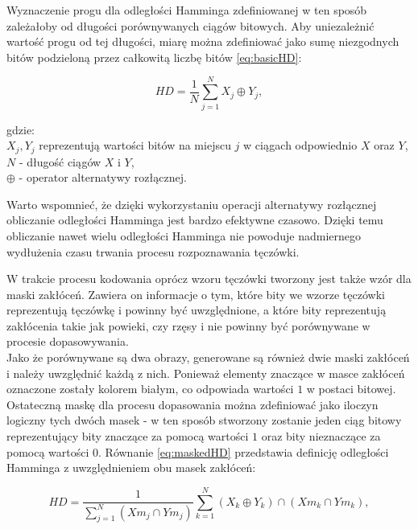 Wyznaczenie progu dla odległości Hamminga zdefiniowanej w ten sposób zależałoby od długości
porównywanych ciągów bitowych. Aby uniezależni\'c wartoś\'c progu od tej długości, miarę można
zdefiniowa\'c jako sumę niezgodnych bitów podzieloną przez całkowitą liczbę bitów \ref{eq:basicHD}:

\begin{equation}
  \mathit{HD} = \frac{1}{N}\sum\limits_{j=1}^{N}X_{j} \oplus Y_{j},
  \label{eq:basicHD}
\end{equation}

\noindent
gdzie:\\
\indent $X_{j}, Y_{j}$ reprezentują wartości bitów na miejscu $j$ w ciągach odpowiednio $X$ oraz $Y$,\\
\indent $N$ - długoś\'c ciągów $X$ i $Y$,\\
\indent $\oplus$ - operator alternatywy rozłącznej.\newline

Warto wspomnie\'c, że dzięki wykorzystaniu operacji alternatywy rozłącznej obliczanie odległości
Hamminga jest bardzo efektywne czasowo. Dzięki temu obliczanie nawet wielu odległości Hamminga nie powoduje
nadmiernego wydłużenia czasu trwania procesu rozpoznawania tęczówki.

W trakcie procesu kodowania oprócz wzoru tęczówki tworzony jest także wzór dla maski zakłóceń.
Zawiera on informacje o tym, które bity we wzorze tęczówki reprezentują tęczówkę i powinny by\'c
uwzględnione, a które bity reprezentują zakłócenia takie jak powieki, czy rzęsy i nie powinny by\'c
porównywane w procesie dopasowywania.\\
Jako że porównywane są dwa obrazy, generowane są również dwie maski zakłóceń i należy uwzględni\'c
każdą z nich. Ponieważ elementy znaczące w masce zakłóceń oznaczone zostały kolorem białym, co odpowiada
wartości $1$ w postaci bitowej. Ostateczną maskę dla procesu dopasowania można zdefiniowa\'c jako
iloczyn logiczny tych dwóch masek - w ten sposób stworzony zostanie jeden ciąg bitowy reprezentujący
bity znaczące za pomocą wartości $1$ oraz bity nieznaczące za pomocą wartości $0$.
Równanie \ref{eq:maskedHD} przedstawia definicję odległości Hamminga z uwzględnieniem obu masek zakłóceń:

\begin{equation}
  \mathit{HD} = \frac{1}{\sum\limits_{j=1}^{N} \left( \mathit{Xm}_{j} \cap \mathit{Ym}_{j} \right) }
       \sum\limits_{k=1}^{N} \left(X_{k} \oplus Y_{k} \right) \cap \left( \mathit{Xm}_{k} \cap \mathit{Ym}_{k} \right),
  \label{eq:maskedHD}
\end{equation}

